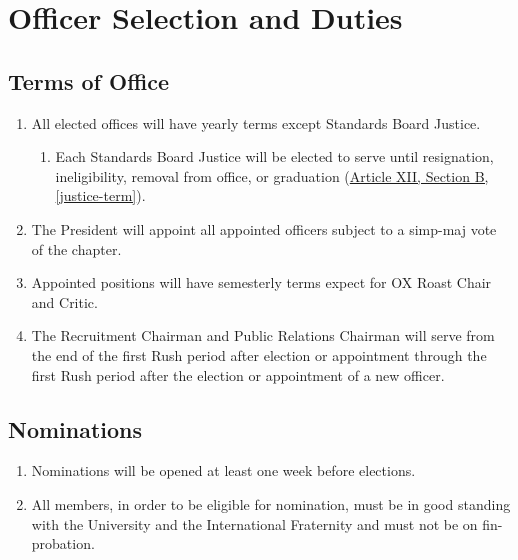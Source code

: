 \chapter{Officer Selection and Duties}

\section{Terms of Office}
	\begin{enumerate}
		\item All elected offices will have yearly terms except Standards Board Justice.
			\begin{enumerate}

				\item Each Standards Board Justice will be elected to serve until resignation, ineligibility, removal from office, or graduation (\hyperref[justice-term]{Article XII, Section B, \autoref*{justice-term}}).
			\end{enumerate}
		\item The President will appoint all appointed officers subject to a \gls{simp-maj} vote of the chapter. \label{appointed-approval}
			
		\item Appointed positions will have semesterly terms expect for OX Roast Chair and Critic.
		
		\item The Recruitment Chairman and Public Relations Chairman will serve from the end of the first Rush period after election or appointment through the first Rush period after the election or appointment of a new officer.
	\end{enumerate}

\section{Nominations}
	\begin{enumerate}
		\item Nominations will be opened at least one week before elections.
		\item All members, in order to be eligible for nomination, must be in good standing with the University and the International Fraternity and must not be on \gls{fin-probation}.
	\end{enumerate}


